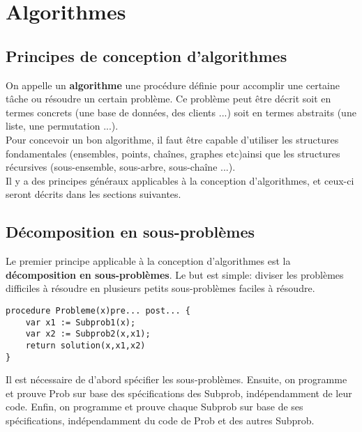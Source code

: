 \section{Algorithmes}


\subsection{Principes de conception d'algorithmes}
On appelle un \textbf{algorithme} une procédure définie pour accomplir une certaine tâche ou résoudre un certain problème. Ce problème peut être décrit soit en termes concrets (une base de données, des clients ...) soit en termes abstraits (une liste, une permutation ...). \\
Pour concevoir un bon algorithme, il faut être capable d'utiliser les structures fondamentales (ensembles, points, chaînes, graphes etc)ainsi que les structures récursives (sous-ensemble, sous-arbre, sous-chaîne ...). \\
Il y a des principes généraux applicables à la conception d'algorithmes, et ceux-ci seront décrits dans les sections suivantes.




\subsection{Décomposition en sous-problèmes}
Le premier principe applicable à la conception d'algorithmes est la \textbf{décomposition en sous-problèmes}. Le but est simple: diviser les problèmes difficiles à résoudre en plusieurs petits sous-problèmes faciles à résoudre.
\begin{lstlisting}
procedure Probleme(x)pre... post... {
	var x1 := Subprob1(x);
	var x2 := Subprob2(x,x1);
	return solution(x,x1,x2)
}
\end{lstlisting}

Il est nécessaire de d'abord spécifier les sous-problèmes. Ensuite, on programme et prouve Prob sur base des spécifications des Subprob, indépendamment de leur code. Enfin, on programme et prouve chaque Subprob sur base de ses spécifications, indépendamment du code de Prob et des autres Subprob.


